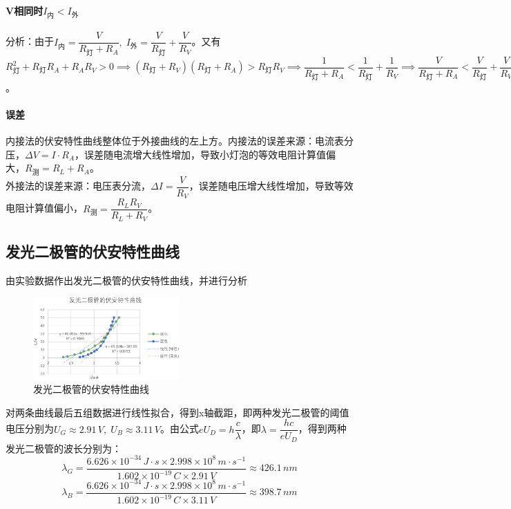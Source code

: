 \documentclass[12pt,a4paper]{article}
\begin{document}
			\paragraph{V相同时$I_{\text{内}}<I_{\text{外}}$\\}
				分析：由于$I_{\text{内}}=\dfrac{V}{R_{\text{灯}}+R_A},\;I_{\text{外}}=\dfrac{V}{R_{\text{灯}}}+\dfrac{V}{R_V}$。又有$R_{\text{灯}}^2+R_{\text{灯}}R_A+R_AR_V>0 \implies (R_{\text{灯}}+R_V)(R_{\text{灯}}+R_A)>R_{\text{灯}}R_V \implies \dfrac{1}{R_{\text{灯}}+R_A}<\dfrac{1}{R_{\text{灯}}}+\dfrac{1}{R_V} \implies \dfrac{V}{R_{\text{灯}}+R_A}<\dfrac{V}{R_{\text{灯}}}+\dfrac{V}{R_V} \implies I_{\text{内}}<I_{\text{外}}$。
			\paragraph{误差\\}
				内接法的伏安特性曲线整体位于外接曲线的左上方。内接法的误差来源：电流表分压，$\Delta V = I \cdot R_A$，误差随电流增大线性增加，导致小灯泡的等效电阻计算值偏大，$R_{\text{测}} = R_L + R_A$。\\
				外接法的误差来源：电压表分流，$\Delta I = \dfrac{V}{R_V}$，误差随电压增大线性增加，导致等效电阻计算值偏小，$R_{\text{测}} = \dfrac{R_L R_V}{R_L + R_V}$。
		
		\subsection{发光二极管的伏安特性曲线}
			由实验数据作出发光二极管的伏安特性曲线，并进行分析
			\begin{figure}[H]
				\centering
					\includegraphics[width=0.5\textwidth]{发光.png} %
				\caption{发光二极管的伏安特性曲线}
				\label{fig:example}
		  	\end{figure}
			对两条曲线最后五组数据进行线性拟合，得到x轴截距，即两种发光二极管的阈值电压分别为$U_G \approx 2.91\,V,\;U_B \approx 3.11\,V$。由公式$eU_D=h\dfrac{c}{\lambda}$，即$\lambda=\dfrac{hc}{eU_D}$，得到两种发光二极管的波长分别为：
			$$\lambda_G=\dfrac{6.626\times10^{-34}\,J\cdot s \times 2.998\times10^8\,m\cdot s^{-1}}{1.602\times10^{-19}\,C\times2.91\,V} \approx 426.1\,nm$$
    		$$\lambda_B=\dfrac{6.626\times10^{-34}\,J\cdot s \times 2.998\times10^8\,m\cdot s^{-1}}{1.602\times10^{-19}\,C\times3.11\,V} \approx 398.7\,nm$$
    
\end{document}

